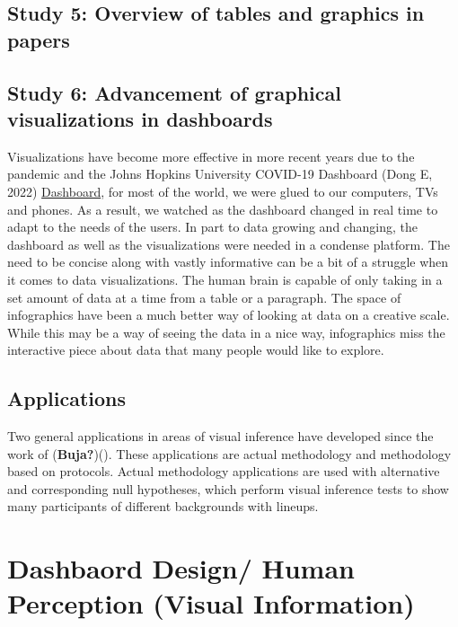 \documentclass[print]{nuthesis}
\begin{document}
\hypertarget{study-5-overview-of-tables-and-graphics-in-papers}{%
\subsection{Study 5: Overview of tables and graphics in papers}\label{study-5-overview-of-tables-and-graphics-in-papers}}

\hypertarget{study-6-advancement-of-graphical-visualizations-in-dashboards}{%
\subsection{Study 6: Advancement of graphical visualizations in dashboards}\label{study-6-advancement-of-graphical-visualizations-in-dashboards}}

Visualizations have become more effective in more recent years due to the pandemic and the Johns Hopkins University COVID-19 Dashboard (Dong E, 2022) \href{https://coronavirus.jhu.edu/map.html}{Dashboard}, for most of the world, we were glued to our computers, TVs and phones. As a result, we watched as the dashboard changed in real time to adapt to the needs of the users. In part to data growing and changing, the dashboard as well as the visualizations were needed in a condense platform. The need to be concise along with vastly informative can be a bit of a struggle when it comes to data visualizations. The human brain is capable of only taking in a set amount of data at a time from a table or a paragraph. The space of infographics have been a much better way of looking at data on a creative scale. While this may be a way of seeing the data in a nice way, infographics miss the interactive piece about data that many people would like to explore.

\hypertarget{applications}{%
\subsection{Applications}\label{applications}}

Two general applications in areas of visual inference have developed since the work of (\textbf{Buja?})(). These applications are actual methodology and methodology based on protocols. Actual methodology applications are used with alternative and corresponding null hypotheses, which perform visual inference tests to show many participants of different backgrounds with lineups.

\hypertarget{dashbaord-design-human-perception-visual-information}{%
\section{Dashbaord Design/ Human Perception (Visual Information)}\label{dashbaord-design-human-perception-visual-information}}
\end{document}

